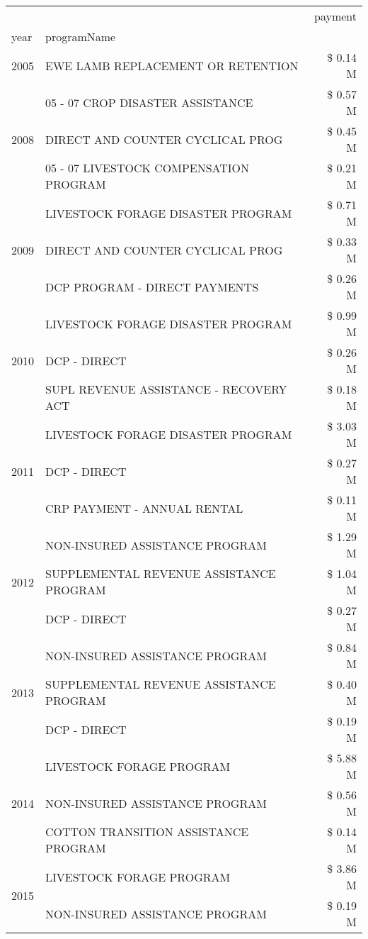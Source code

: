 \begin{tabular}{llr}
\toprule
 &  & payment \\
year & programName &  \\
\midrule
2005 & EWE LAMB REPLACEMENT OR RETENTION & \$ 0.14 M \\
\cline{1-3}
\multirow[t]{3}{*}{2008} & 05 - 07 CROP DISASTER ASSISTANCE & \$ 0.57 M \\
 & DIRECT AND COUNTER CYCLICAL PROG & \$ 0.45 M \\
 & 05 - 07 LIVESTOCK COMPENSATION PROGRAM & \$ 0.21 M \\
\cline{1-3}
\multirow[t]{3}{*}{2009} & LIVESTOCK FORAGE DISASTER  PROGRAM & \$ 0.71 M \\
 & DIRECT AND COUNTER CYCLICAL PROG & \$ 0.33 M \\
 & DCP PROGRAM - DIRECT PAYMENTS & \$ 0.26 M \\
\cline{1-3}
\multirow[t]{3}{*}{2010} & LIVESTOCK FORAGE DISASTER PROGRAM & \$ 0.99 M \\
 & DCP - DIRECT & \$ 0.26 M \\
 & SUPL REVENUE ASSISTANCE - RECOVERY ACT & \$ 0.18 M \\
\cline{1-3}
\multirow[t]{3}{*}{2011} & LIVESTOCK FORAGE DISASTER PROGRAM & \$ 3.03 M \\
 & DCP - DIRECT & \$ 0.27 M \\
 & CRP PAYMENT - ANNUAL RENTAL & \$ 0.11 M \\
\cline{1-3}
\multirow[t]{3}{*}{2012} & NON-INSURED ASSISTANCE PROGRAM & \$ 1.29 M \\
 & SUPPLEMENTAL REVENUE ASSISTANCE PROGRAM & \$ 1.04 M \\
 & DCP - DIRECT & \$ 0.27 M \\
\cline{1-3}
\multirow[t]{3}{*}{2013} & NON-INSURED ASSISTANCE PROGRAM & \$ 0.84 M \\
 & SUPPLEMENTAL REVENUE ASSISTANCE PROGRAM & \$ 0.40 M \\
 & DCP - DIRECT & \$ 0.19 M \\
\cline{1-3}
\multirow[t]{3}{*}{2014} & LIVESTOCK FORAGE PROGRAM & \$ 5.88 M \\
 & NON-INSURED ASSISTANCE PROGRAM & \$ 0.56 M \\
 & COTTON TRANSITION ASSISTANCE PROGRAM & \$ 0.14 M \\
\cline{1-3}
\multirow[t]{3}{*}{2015} & LIVESTOCK FORAGE PROGRAM & \$ 3.86 M \\
 & NON-INSURED ASSISTANCE PROGRAM & \$ 0.19 M \\

\end{tabular}
